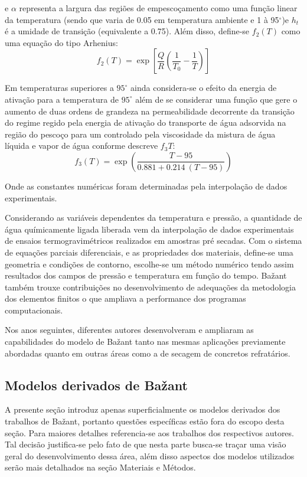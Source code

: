     e $\alpha$ representa a largura das regiões de empescoçamento como uma
    função linear da temperatura (sendo que varia de 0.05 em temperatura
    ambiente e 1 à 95$^{\circ}$)e $h_t$ é a umidade de transição (equivalente a
    0.75). Além disso, define-se $f_2(T)$ como uma equação do tipo Arhenius:
    \begin{equation}
      \label{eq:f2}
     f_2(T)  = \exp{\left[\frac{Q}{R}\left( \frac{1}{T_0} - \frac{1}{T} \right) \right]}
    \end{equation}
    
    
    Em temperaturas superiores a $95^{\circ}$ ainda considera-se o efeito da
    energia de ativação para a temperatura de $95^{\circ}$ além de se considerar
    uma função que gere o aumento de duas ordens de grandeza na permeabilidade
    decorrente da transição do regime regido pela energia de ativação do
    transporte de água adsorvida na região do pescoço para um
    controlado pela viscosidade da mistura de água líquida e vapor de água
    conforme descreve $f_3{T}$:
    \begin{equation}
      \label{eq:f3}
     f_3(T) = \exp{\left( \frac{T-95}{0.881+0.214 \ (T-95)} \right)}
    \end{equation}

    Onde as constantes numéricas foram determinadas pela interpolação de dados
    experimentais.

    Considerando as variáveis dependentes da temperatura e pressão, a quantidade
    de água químicamente ligada liberada vem da interpolação de dados
    experimentais de ensaios termogravimétricos realizados em amostras pré
    secadas. Com o sistema de equações parciais diferenciais, e as propriedades
    dos materiais, define-se uma geometria e condições de contorno, escolhe-se
    um método numérico tendo assim resultados dos campos de pressão e
    temperatura em função do tempo. Ba\v{z}ant também trouxe contribuições
    no desenvolvimento de adequações da metodologia dos elementos
    finitos o que ampliava a performance dos programas computacionais.

    Nos anos seguintes, diferentes autores desenvolveram e ampliaram as
    capabilidades do modelo de Ba\v{z}ant tanto nas mesmas aplicações
    previamente abordadas quanto em outras áreas como a de secagem de concretos
    refratários.
    
    
    \subsection{Modelos derivados de Ba\v{z}ant}\label{sec:deriv_bazant}
    A presente seção introduz apenas superficialmente os modelos derivados dos
    trabalhos de Ba\v{z}ant, portanto questões específicas estão fora do escopo
    desta seção. Para maiores detalhes referencia-se aos trabalhos dos
    respectivos autores. Tal decisão justifica-se pelo fato de que nesta parte
    busca-se traçar uma visão geral do desenvolvimento dessa área, além disso
    aspectos dos modelos utilizados serão mais detalhados na seção Materiais e
    Métodos.

